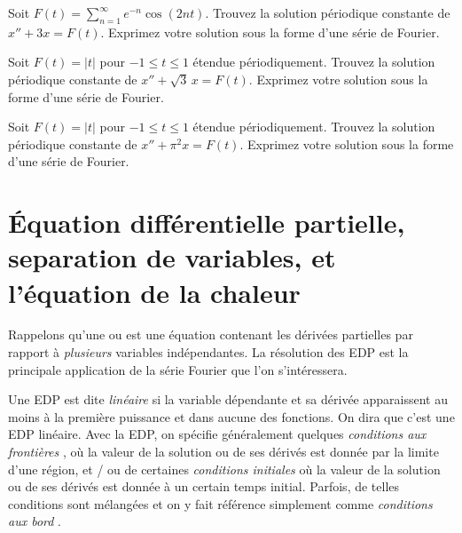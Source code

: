 \begin{exercise}
Soit $F(t) = \sum_{n=1}^\infty e^{-n} \cos(2 n t)$.
Trouvez la solution périodique constante de $x'' + 3 x = F(t)$.
Exprimez votre solution sous la forme d'une série de Fourier.
\end{exercise}

\begin{exercise}
Soit $F(t) = \lvert t \rvert$ pour $-1 \leq t \leq 1$ étendue périodiquement.
Trouvez la solution périodique constante de $x'' + \sqrt{3}\, x = F(t)$.
Exprimez votre solution sous la forme d'une série de Fourier.
\end{exercise}

\begin{exercise}
Soit $F(t) = \lvert t \rvert$ pour $-1 \leq t \leq 1$ étendue périodiquement.
Trouvez la solution périodique constante de $x'' + \pi^2 x = F(t)$.
Exprimez votre solution sous la forme d'une série de Fourier.
\end{exercise}



\sectionnewpage
\section[Équation de la chaleur]{Équation différentielle partielle, separation de variables, et l'équation de la chaleur}
\label{heateq:section}


Rappelons qu'une \emph{} ou
\emph{} est une équation contenant les dérivées partielles
par rapport à \emph{plusieurs} variables indépendantes. La résolution des EDP
est la  principale application de la série Fourier que l'on s'intéressera.

Une EDP est dite  \emph{linéaire} si la variable dépendante et sa dérivée apparaissent au moins à la première puissance et dans aucune des fonctions. On dira que c'est une EDP linéaire. Avec la EDP\@,
on spécifie généralement quelques
\emph{conditions aux frontières },
où la valeur de la solution ou de ses dérivés est donnée par
la limite d'une région, et / ou de
certaines
\emph{conditions initiales } 
où la valeur
de la solution ou de ses dérivés est donnée à un certain temps initial.
Parfois, de telles conditions sont mélangées et on y fait référence
simplement comme
\emph{conditions aux bord }.

